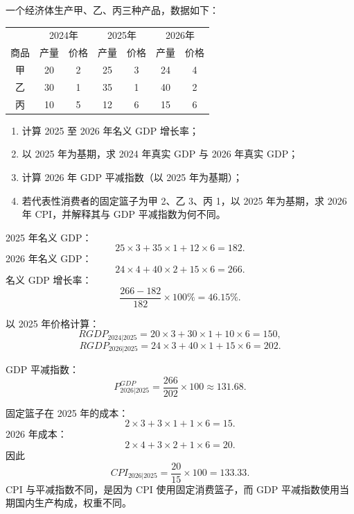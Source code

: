 \begin{question}
一个经济体生产甲、乙、丙三种产品，数据如下：
\begin{center}
\begin{tabular}{c|cc|cc|cc}
 & \multicolumn{2}{c|}{2024年} & \multicolumn{2}{c|}{2025年} & \multicolumn{2}{c}{2026年} \\
商品 & 产量 & 价格 & 产量 & 价格 & 产量 & 价格 \\\hline
甲 & 20 & 2 & 25 & 3 & 24 & 4 \\
乙 & 30 & 1 & 35 & 1 & 40 & 2 \\
丙 & 10 & 5 & 12 & 6 & 15 & 6
\end{tabular}
\end{center}
\begin{enumerate}[label=(\alph*),leftmargin=2.5em]
  \item 计算 2025 至 2026 年名义 GDP 增长率；
  \item 以 2025 年为基期，求 2024 年真实 GDP 与 2026 年真实 GDP；
  \item 计算 2026 年 GDP 平减指数（以 2025 年为基期）；
  \item 若代表性消费者的固定篮子为甲 2、乙 3、丙 1，以 2025 年为基期，求 2026 年 CPI，并解释其与 GDP 平减指数为何不同。
\end{enumerate}
\begin{solution}
2025 年名义 GDP：
\[
25\times3+35\times1+12\times6=182.
\]
2026 年名义 GDP：
\[
24\times4+40\times2+15\times6=266.
\]
名义 GDP 增长率：
\[
\frac{266-182}{182}\times100\%=46.15\%.
\]

以 2025 年价格计算：
\[
RGDP_{2024|2025}=20\times3+30\times1+10\times6=150,
\]
\[
RGDP_{2026|2025}=24\times3+40\times1+15\times6=202.
\]

GDP 平减指数：
\[
P^{GDP}_{2026|2025}=\frac{266}{202}\times100\approx 131.68.
\]

固定篮子在 2025 年的成本：
\[
2\times3+3\times1+1\times6=15.
\]
2026 年成本：
\[
2\times4+3\times2+1\times6=20.
\]
因此
\[
CPI_{2026|2025}=\frac{20}{15}\times100=133.33.
\]
CPI 与平减指数不同，是因为 CPI 使用固定消费篮子，而 GDP 平减指数使用当期国内生产构成，权重不同。
\end{solution}
\end{question}

